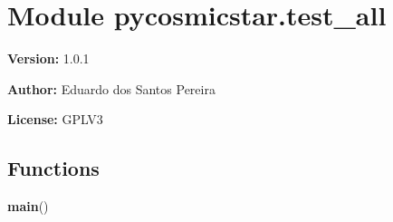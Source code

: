 %
%
%


\section{Module pycosmicstar.test\_all}

    \label{pycosmicstar:test_all}
\textbf{Version:} 1.0.1



\textbf{Author:} Eduardo dos Santos Pereira



\textbf{License:} GPLV3





  \subsection{Functions}

    \label{pycosmicstar:test_all:main}

    \vspace{0.5ex}

\hspace{.8\funcindent}\begin{boxedminipage}{\funcwidth}

    \raggedright \textbf{main}()

\setlength{\parskip}{2ex}
\setlength{\parskip}{1ex}
    \end{boxedminipage}



